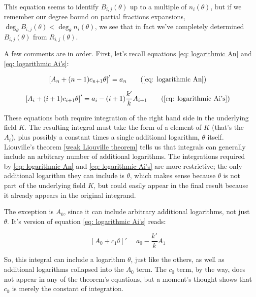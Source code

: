 This equation seems to identify $B_{i,j}(\theta)$ up to a multiple of $n_i(\theta)$,
but if we remember our degree bound on partial fractions expansions,
$\deg_\theta B_{i,j}(\theta) < \deg_\theta n_i(\theta)$, we see
that in fact we've completely determined $B_{i,j}(\theta)$ from
$R_{i,j}(\theta)$.

\endtheorem

A few comments are in order.  First, let's recall equations
\eqref{eq: logarithmic An} and \eqref{eq: logarithmic Ai's}:

\begin{equation}
\left[ A_n + (n+1) c_{n+1} \theta \right]' = a_n
\tag{\ref{eq: logarithmic An}}
\end{equation}

\begin{equation}
\left[ A_i + (i+1) c_{i+1} \theta \right]' = a_i - (i+1) \frac{k'}{k} A_{i+1}
\tag{\ref{eq: logarithmic Ai's}}
\end{equation}

These equations both require integration of the right hand side in the
underlying field $K$.  The resulting integral must take the form of a
element of $K$ (that's the $A_i$), plus possibly a constant times a
single additional logarithm, $\theta$ itself.  Liouville's
theorem \ref{weak Liouville theorem} tells us that integrals can
generally include an arbitrary number of additional logarithms.  The
integrations required by
\eqref{eq: logarithmic An} and \eqref{eq: logarithmic Ai's}
are more restrictive; the only additional logarithm they can include
is $\theta$, which makes sense because $\theta$ is not part of the
underlying field $K$, but could easily appear in the final result
because it already appears in the original integrand.

The exception is $A_0$, since it can include arbitrary additional
logarithms, not just $\theta$.  It's version of equation
\eqref{eq: logarithmic Ai's} reads:

\begin{equation}
\left[ A_0 + c_1 \theta \right]' = a_0 - \frac{k'}{k} A_1
\end{equation}

So, this integral can include a logarithm $\theta$, just like the
others, as well as additional logarithms collapsed into the $A_0$
term.  The $c_0$ term, by the way, does not appear in any of the
theorem's equations, but a moment's thought shows that $c_0$ is
merely the constant of integration.

\vfill\eject

